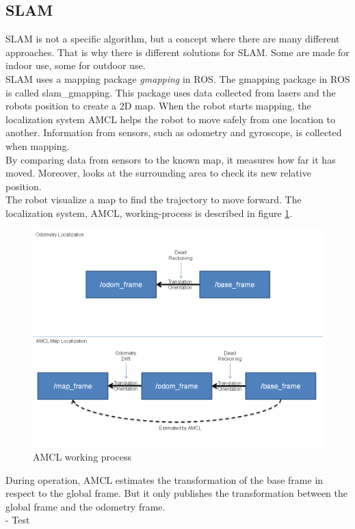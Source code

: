 \subsection{SLAM}
SLAM is not a specific algorithm, but a concept where there are many different approaches. That is why there is different solutions for SLAM. Some are made for indoor use, some for outdoor use.\\
SLAM uses a mapping package \textit{gmapping} in ROS. The gmapping package in ROS is called slam\_gmapping. This package uses data collected from lasers and the robots position to create a 2D map. %
When the robot starts mapping, the localization system AMCL helps the robot to move safely from one location to another.
Information from sensors, such as odometry and gyroscope, is collected when mapping. \\
By comparing data from sensors to the known map, it measures how far it has moved. Moreover, looks at the surrounding area to check its new relative position.\\The robot visualize a map to find the trajectory to move forward. The localization system, AMCL, working-process is described in figure \ref{fig:amcl}.
\begin{figure}
    \centering
    \includegraphics[width=.7\textwidth]{figures/AMCL.png}
    \caption{AMCL working process\cite{AMCL}} 
    \label{fig:amcl} 
\end{figure}
 During operation, AMCL estimates the transformation of the base frame in respect to the global frame. But it only publishes the transformation between the global frame and the odometry frame\cite{AMCL}.\\

- Test


